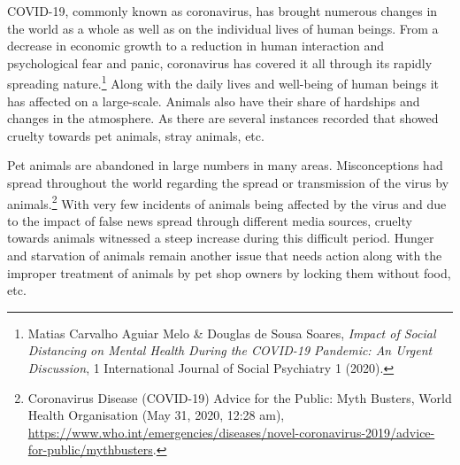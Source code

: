 \setcounter{figure}{0}
\setcounter{table}{0}
\setcounter{footnote}{0}

\label{2021-art4}



\begin{multicols}{2}


\noi
COVID-19, commonly known as coronavirus, has brought numerous changes in the world as
a whole as well as on the individual lives of human beings. From a decrease in economic
growth to a reduction in human interaction and psychological fear and panic, coronavirus has
covered it all through its rapidly spreading nature.\footnote{Matias Carvalho Aguiar Melo \& Douglas de Sousa Soares, \textit{Impact of Social Distancing on Mental Health
During the COVID-19 Pandemic: An Urgent Discussion}, 1 International Journal of Social Psychiatry 1 (2020).}
 Along with the daily lives and well-being
of human beings it has affected on a large-scale. Animals also have their share of hardships
and changes in the atmosphere. As there are several instances recorded that showed cruelty
towards pet animals, stray animals, etc. 

\noi
Pet animals are abandoned in large numbers in many areas. Misconceptions had spread
throughout the world regarding the spread or transmission of the virus by animals.\footnote{Coronavirus Disease (COVID-19) Advice for the Public: Myth Busters, World Health Organisation (May 31,
2020, 12:28 am), \url{https://www.who.int/emergencies/diseases/novel-coronavirus-2019/advice-for-public/mythbusters}. }
 With very
few incidents of animals being affected by the virus and due to the impact of false news
spread through different media sources, cruelty towards animals witnessed a steep increase
during this difficult period. Hunger and starvation of animals remain another issue that needs
action along with the improper treatment of animals by pet shop owners by locking them
without food, etc.


\end{multicols}
